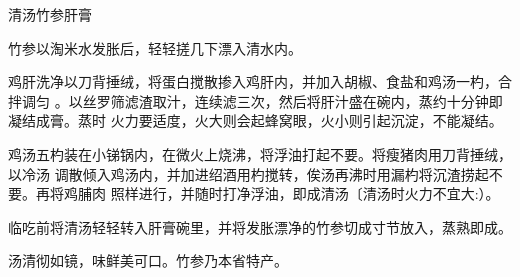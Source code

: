 \begin{recipe}{清汤竹参肝膏}

\ingredients


\cooking

竹参以淘米水发胀后，轻轻搓几下漂入清水内。

鸡肝洗净以刀背捶绒，将蛋白搅散掺入鸡肝内，并加入胡椒、食盐和鸡汤一杓，合拌调匀
。以丝罗筛滤渣取汁，连续滤三次，然后将肝汁盛在碗内，蒸约十分钟即凝结成膏。蒸时
火力要适度，火大则会起蜂窝眼，火小则引起沉淀，不能凝结。

鸡汤五杓装在小锑锅内，在微火上烧沸，将浮油打起不要。将瘦猪肉用刀背捶绒，以冷汤
调散倾入鸡汤内，并加进绍酒用杓搅转，俟汤再沸时用漏杓将沉渣捞起不要。再将鸡脯肉
照样进行，并随时打净浮油，即成清汤〔清汤时火力不宜大:）。

临吃前将清汤轻轻转入肝膏碗里，并将发胀漂净的竹参切成寸节放入，蒸熟即成。

\features

汤清彻如镜，味鲜美可口。竹参乃本省特产。

\end{recipe}

